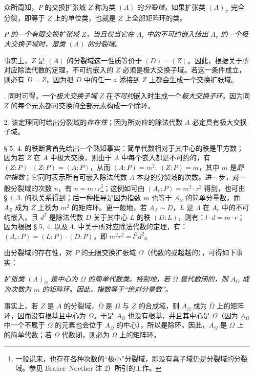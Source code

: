众所周知，\(P\) 的交换扩张域 \(Z\) 称为类 \((A)\) 的\emph{分裂域}，如果扩张类 \((A)_Z\) 完全分裂，即等于 \(Z\) 上的单位类，也就是 \(Z\) 上全部矩阵环的类。

\noindent\textbf{}
\emph{\(P\) 的一个有限交换扩张域 \(Z\)，当且仅当它在 \(A_r\) 中的不可约嵌入给出 \(A_r\) 的一个极大交换子域时，是类 \((A)\) 的分裂域。}

事实上，\(Z\) 是 \((A)\) 的分裂域这一性质等价于 \((D)=(Z)\)。因此，根据关于所对应除法代数的定理，不可约嵌入的 \(Z\) 必须是极大交换子域。若这一条件成立，则必有 \(D=Z\)，因为把 \(D\) 中的任一 \(a\) 添接到 \(Z\) 上都会生成一个交换扩张域。

\noindent\textbf{}. 同时可得，一个\emph{极大交换子域} \(Z\) 在\emph{不可约}嵌入时生成一个\emph{极大交换子环}。因为同 \(Z\) 的每个元素都可交换的全部元素构成一个除环。

2. 该定理同时给出分裂域的\emph{存在性}；因为所对应的除法代数 \(A\) 必定具有极大交换子域。

\medskip
\noindent\textbf{}\quad § 5, 4. 的秩断言首先给出一个熟知事实：简单代数相对于其中心的秩是平方数；因为若 \(Z\) 在 \(A\) 中极大交换，则由于 \(A\) 中每个嵌入都是不可约的，有 \((Z:P)\cdot(Z:P)=(A:P)\)，从而 \((A:P)=m^2;\ (Z:P)=m\)，其中 \(m\) 是\emph{舒尔指数}；它同时表示所有可嵌入除法代数 \(A\) 本身的分裂域的次数。进一步，对一般分裂域的次数 \(n\)，有 \(n=m\cdot r\)\footnote{一般说来，也存在各种次数的“极小”分裂域，即没有真子域仍是分裂域的分裂域。参见 Brauer--Noether 注 2）所引的工作。}；这例如可由 \((A_r:P)=m^2\cdot r^2\) 得到，也可由 § 4, 3. 的秩关系得到；后一种推导是因为指数 \(m\) 也等于 \(A_Z\) 的简单分量数，而 \(A_Z\) 成为 \(Z\) 上秩为 \(m^2\) 的矩阵环。更一般地，若 \(A_\Lambda\sim D\)，\(L\) 是 \(\Lambda\) 在 \(A_r\) 中的不可约嵌入，且 \(d^2\) 是除法代数 \(D\) 关于其中心 \(L\) 的秩 \((D:L)\)，则有：\(l\cdot d=m\cdot r\)；因为根据 § 5, 4. 以及 4. 中关于所对应除法代数的定理，有：\((A_r:P)=(L:P)\cdot(D:P)\)，即 \(m^2r^2=l^2d^2\)。

由分裂域的存在性，对 \(P\) 的无限交换扩张域 \(\Omega\)（代数的或超越的），可得如下事实：

\noindent\emph{扩张类 \((A)_\Omega\) 是中心为 \(\Omega\) 的简单代数类。特别地，若 \(\Omega\) 是代数闭的，则 \(A_\Omega\) 成为次数为 \(m\) 的矩阵环。因此，指数等于“绝对分量数”。}

事实上，若 \(Z\) 是 \(A\) 的分裂域，\(\bar\Omega\) 是 \(\Omega\) 与 \(Z\) 的合成域，则 \(A_{\bar\Omega}\) 成为 \(\bar\Omega\) 上的矩阵环，因而没有根基且中心为 \(\bar\Omega\)。于是 \(A_\Omega\) 也没有根基，并且其中心是 \(\Omega\)（因为 \(A_\Omega\) 中一个不属于 \(\Omega\) 的元素也会位于 \(A_{\bar\Omega}\) 的中心），所以是除环。因此，\(A_\Omega\) 是 \(\Omega\) 上的简单代数；若 \(\Omega\) 代数闭，则必为 \(\Omega\) 上的矩阵环。

